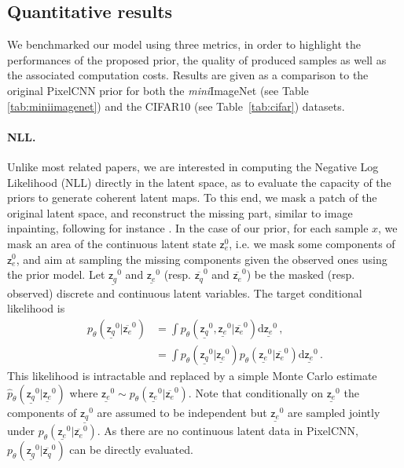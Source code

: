 \documentclass{article}
\theoremstyle{plain}
\theoremstyle{definition}
\theoremstyle{remark}
\newcommand{\latentcont}{\mathsf{z}_e}
\newcommand{\latentdis}{\mathsf{z}_q}
\begin{document}
\subsection{Quantitative results}
We benchmarked our model using three metrics, in order to highlight the performances of the proposed prior, the quality of produced samples as well as the associated computation costs.
Results are given as a comparison to the original PixelCNN prior for both the \textit{mini}ImageNet (see Table \ref{tab:miniimagenet}) and the CIFAR10 (see Table~\ref{tab:cifar}) datasets.

\paragraph{NLL. }\label{nll_paragraph}
Unlike most related papers, we are interested in computing the Negative Log Likelihood (NLL) directly in the latent space, as to evaluate the capacity of the priors to generate coherent latent maps.
To this end, we mask a patch of the original latent space, and reconstruct the missing part, similar to image inpainting, following for instance \cite{van2016pixel}.
 In the case of our prior, for each sample $x$, we mask an area of the continuous latent state $\latentcont^0$, i.e. we mask some components of $\latentcont^0$, and aim at sampling the missing components given the observed ones using the prior model. Let $\underline{\latentdis}^0$ and $\underline{\latentcont}^0$ (resp. $\overline{\latentdis}^0$ and $\overline{\latentcont}^0$) be the masked (resp. observed) discrete and continuous latent variables. The target conditional likelihood is
\begin{align*}
p_{\theta}(\underline{\latentdis}^0|\overline{\latentcont}^0) &= \int p_{\theta}(\underline{\latentdis}^0,\underline{\latentcont}^0|\overline{\latentcont}^0)\mathrm{d} \underline{\latentcont}^0\,,\\
&= \int p_{\theta}(\underline{\latentdis}^0|\underline{\latentcont}^0)p_{\theta}(\underline{\latentcont}^0|\overline{\latentcont}^0)\mathrm{d} \underline{\latentcont}^0\,.
\end{align*}
This likelihood is intractable and replaced by a simple Monte Carlo estimate $\hat{p}_{\theta}(\underline{\latentdis}^0|\underline{\latentcont}^0)$ where $\underline{\latentcont}^0\sim p_{\theta}(\underline{\latentcont}^0|\overline{\latentcont}^0)$. Note that conditionally on $\underline{\latentcont}^0$ the components of $\underline{\latentdis}^0$ are assumed to be independent but $\underline{\latentcont}^0$ are sampled jointly under $p_{\theta}(\underline{\latentcont}^0|\overline{\latentcont}^0)$. As there are no continuous latent data in PixelCNN, $p_{\theta}(\underline{\latentdis}^0|\overline{\latentdis}^0)$ can be directly evaluated.
\end{document}
